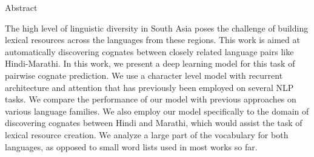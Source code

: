 \begin{center}
\LARGE{Abstract}
\end{center}

\vspace{0.5in}

The high level of linguistic diversity in South Asia poses the challenge of building lexical resources across the languages from these regions. This work is aimed at automatically discovering cognates between closely related language pairs like Hindi-Marathi. In this work, we present a deep learning model for this task of pairwise cognate prediction. We use a character level model with recurrent architecture and attention that has previously been employed on several NLP tasks. We compare the performance of our model with previous approaches on various language families. We also employ our model specifically to the domain of discovering cognates between Hindi and Marathi, which would assist the task of lexical resource creation. We analyze a large part of the vocabulary for both languages, as opposed to small word lists used in most works so far.

